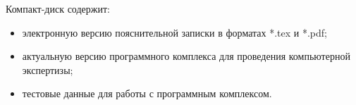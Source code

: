  
 \newpage
 \renewcommand{\refname}{Список использованных источников}
 

 Компакт-диск содержит: 
 \begin{itemize}
 \item электронную версию пояснительной записки в форматах *.tex и *.pdf;
 \item актуальную версию программного комплекса для проведения компьютерной экспертизы;
 \item тестовые данные для работы с программным комплексом.
 \end{itemize}
 

